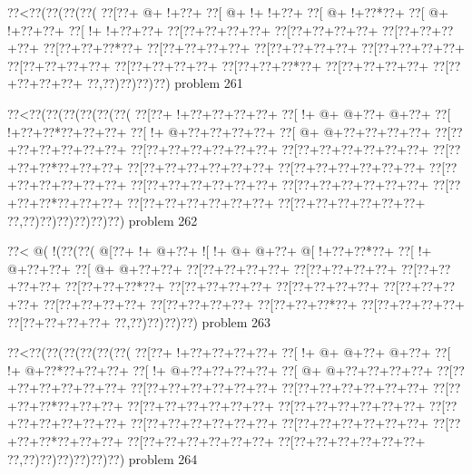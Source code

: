 \vbox{\vbox{\goo
\0??<\0??(\0??(\0??(\0??(
\0??[\0??+\- @+\- !+\0??+
\0??[\- @+\- !+\- !+\0??+
\0??[\- @+\- !+\0??*\0??+
\0??[\- @+\- !+\0??+\0??+
\0??[\- !+\- !+\0??+\0??+
\0??[\0??+\0??+\0??+\0??+
\0??[\0??+\0??+\0??+\0??+
\0??[\0??+\0??+\0??+\0??+
\0??[\0??+\0??+\0??*\0??+
\0??[\0??+\0??+\0??+\0??+
\0??[\0??+\0??+\0??+\0??+
\0??[\0??+\0??+\0??+\0??+
\0??[\0??+\0??+\0??+\0??+
\0??[\0??+\0??+\0??+\0??+
\0??[\0??+\0??+\0??*\0??+
\0??[\0??+\0??+\0??+\0??+
\0??[\0??+\0??+\0??+\0??+
\0??,\0??)\0??)\0??)\0??)
}
\hfil problem 261\hfil\break
}

\vbox{\vbox{\goo
\0??<\0??(\0??(\0??(\0??(\0??(\0??(
\0??[\0??+\- !+\0??+\0??+\0??+\0??+
\0??[\- !+\- @+\- @+\0??+\- @+\0??+
\0??[\- !+\0??+\0??*\0??+\0??+\0??+
\0??[\- !+\- @+\0??+\0??+\0??+\0??+
\0??[\- @+\- @+\0??+\0??+\0??+\0??+
\0??[\0??+\0??+\0??+\0??+\0??+\0??+
\0??[\0??+\0??+\0??+\0??+\0??+\0??+
\0??[\0??+\0??+\0??+\0??+\0??+\0??+
\0??[\0??+\0??+\0??*\0??+\0??+\0??+
\0??[\0??+\0??+\0??+\0??+\0??+\0??+
\0??[\0??+\0??+\0??+\0??+\0??+\0??+
\0??[\0??+\0??+\0??+\0??+\0??+\0??+
\0??[\0??+\0??+\0??+\0??+\0??+\0??+
\0??[\0??+\0??+\0??+\0??+\0??+\0??+
\0??[\0??+\0??+\0??*\0??+\0??+\0??+
\0??[\0??+\0??+\0??+\0??+\0??+\0??+
\0??[\0??+\0??+\0??+\0??+\0??+\0??+
\0??,\0??)\0??)\0??)\0??)\0??)\0??)
}
\hfil problem 262\hfil\break
}

\vbox{\vbox{\goo
\0??<\- @(\- !(\0??(\0??(
\- @[\0??+\- !+\- @+\0??+
\- ![\- !+\- @+\- @+\0??+
\- @[\- !+\0??+\0??*\0??+
\0??[\- !+\- @+\0??+\0??+
\0??[\- @+\- @+\0??+\0??+
\0??[\0??+\0??+\0??+\0??+
\0??[\0??+\0??+\0??+\0??+
\0??[\0??+\0??+\0??+\0??+
\0??[\0??+\0??+\0??*\0??+
\0??[\0??+\0??+\0??+\0??+
\0??[\0??+\0??+\0??+\0??+
\0??[\0??+\0??+\0??+\0??+
\0??[\0??+\0??+\0??+\0??+
\0??[\0??+\0??+\0??+\0??+
\0??[\0??+\0??+\0??*\0??+
\0??[\0??+\0??+\0??+\0??+
\0??[\0??+\0??+\0??+\0??+
\0??,\0??)\0??)\0??)\0??)
}
\hfil problem 263\hfil\break
}

\vbox{\vbox{\goo
\0??<\0??(\0??(\0??(\0??(\0??(\0??(
\0??[\0??+\- !+\0??+\0??+\0??+\0??+
\0??[\- !+\- @+\- @+\0??+\- @+\0??+
\0??[\- !+\- @+\0??*\0??+\0??+\0??+
\0??[\- !+\- @+\0??+\0??+\0??+\0??+
\0??[\- @+\- @+\0??+\0??+\0??+\0??+
\0??[\0??+\0??+\0??+\0??+\0??+\0??+
\0??[\0??+\0??+\0??+\0??+\0??+\0??+
\0??[\0??+\0??+\0??+\0??+\0??+\0??+
\0??[\0??+\0??+\0??*\0??+\0??+\0??+
\0??[\0??+\0??+\0??+\0??+\0??+\0??+
\0??[\0??+\0??+\0??+\0??+\0??+\0??+
\0??[\0??+\0??+\0??+\0??+\0??+\0??+
\0??[\0??+\0??+\0??+\0??+\0??+\0??+
\0??[\0??+\0??+\0??+\0??+\0??+\0??+
\0??[\0??+\0??+\0??*\0??+\0??+\0??+
\0??[\0??+\0??+\0??+\0??+\0??+\0??+
\0??[\0??+\0??+\0??+\0??+\0??+\0??+
\0??,\0??)\0??)\0??)\0??)\0??)\0??)
}
\hfil problem 264\hfil\break
}

